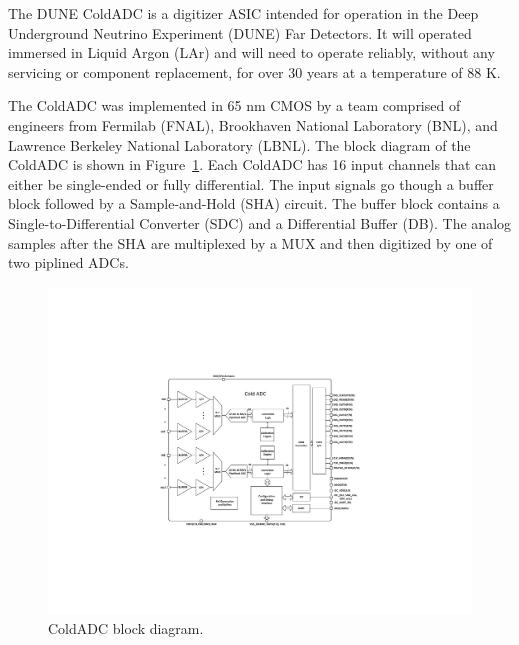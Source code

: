 \label{sec:1}

The DUNE ColdADC is a digitizer ASIC intended for operation in the Deep Underground Neutrino Experiment (DUNE) Far Detectors. It will operated immersed in Liquid Argon (LAr) and will need to operate reliably, without any servicing or component replacement, for over 30 years at a temperature of 88 K.

The ColdADC was implemented in 65 nm CMOS by a team comprised of engineers from Fermilab (FNAL), Brookhaven National Laboratory (BNL), and Lawrence Berkeley National Laboratory (LBNL). The block diagram of the ColdADC is shown in Figure~\ref{fig:coldadc_blockdiagram}.
Each ColdADC has 16 input channels that can either be single-ended or fully differential. The input signals go though a buffer block followed by a Sample-and-Hold (SHA) circuit. The buffer block contains a Single-to-Differential Converter (SDC) and a Differential Buffer (DB). The analog samples after the SHA are multiplexed by a MUX and then digitized by one of two piplined ADCs.
\begin{figure}[h!]
\centering
  \includegraphics[width=0.8\linewidth]{figures/coldadc_blockdiagram.pdf}
  \caption{ColdADC block diagram.}
  \label{fig:coldadc_blockdiagram}
\end{figure}

